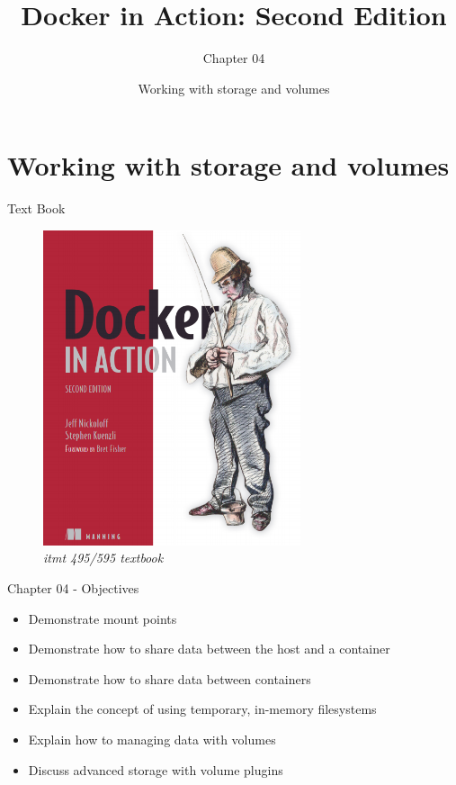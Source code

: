 \documentclass[ignorenonframetext,]{beamer}
\title{Docker in Action: Second Edition}
\author{Chapter 04}
\date{Working with storage and volumes}
\providecommand{\tightlist}{%
  \setlength{\itemsep}{0pt}\setlength{\parskip}{0pt}}
\begin{document}
\frame{\titlepage}

\hypertarget{working-with-storage-and-volumes}{%
\section{Working with storage and
volumes}\label{working-with-storage-and-volumes}}

\begin{frame}{Text Book}
\protect\hypertarget{text-book}{}

\begin{figure}
\centering
\includegraphics[width=\textwidth,height=3.64583in]{./tex2pdf.-d218b5bed17bed47/9157dca3b5e68de9ca71f68394cbf91d05a2314a.png}
\caption{\emph{itmt 495/595 textbook}}
\end{figure}

\end{frame}

\begin{frame}{Chapter 04 - Objectives}
\protect\hypertarget{chapter-04---objectives}{}

\begin{itemize}
\tightlist
\item
  Demonstrate mount points
\item
  Demonstrate how to share data between the host and a container
\item
  Demonstrate how to share data between containers
\item
  Explain the concept of using temporary, in-memory filesystems
\item
  Explain how to managing data with volumes
\item
  Discuss advanced storage with volume plugins
\end{itemize}

\end{frame}
\end{document}
